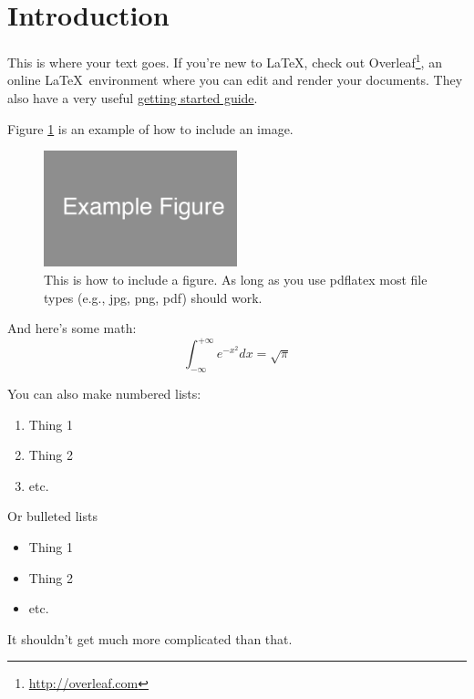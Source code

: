 
\section{Introduction}
This is where your text goes.
If you're new to \LaTeX, check out Overleaf\footnote{\url{http://overleaf.com}}, an online \LaTeX~environment where you can edit and render your documents.
They also have a very useful \href{http://www.overleaf.com/help/18-how-do-i-use-overleaf}{getting started guide}.

Figure \ref{fig:example_figure} is an example of how to include an image.

\begin{figure}[ht]
  \begin{center}
    \includegraphics[width=0.5\textwidth]{example_figure.png}
    \caption{
      This is how to include a figure.
      As long as you use pdflatex most file types (e.g., jpg, png, pdf) should work.}
    \label{fig:example_figure}
  \end{center}
\end{figure}

And here's some math:
\begin{equation}
  \int_{-\infty}^{+\infty} e^{-x^2} dx = \sqrt{\pi}
\end{equation}

You can also make numbered lists:
\begin{enumerate}
  \item Thing 1
  \item Thing 2
  \item etc.
\end{enumerate}

Or bulleted lists
\begin{itemize}
  \item Thing 1
  \item Thing 2
  \item etc.
\end{itemize}

It shouldn't get much more complicated than that.

